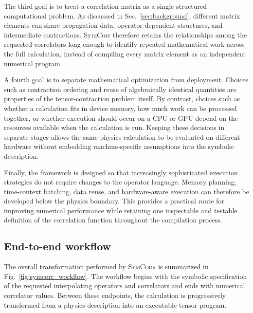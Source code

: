 \documentclass[11pt]{article}
\begin{document}
The third goal is to treat a correlation matrix as a single structured
computational problem. As discussed in Sec.~\ref{sec:background}, different
matrix elements can share propagation data, operator-dependent structures, and
intermediate contractions. SymCorr therefore retains the relationships among
the requested correlators long enough to identify repeated mathematical work
across the full calculation, instead of compiling every matrix element as an
independent numerical program.

A fourth goal is to separate mathematical optimization from deployment. Choices
such as contraction ordering and reuse of algebraically identical quantities
are properties of the tensor-contraction problem itself. By contrast, choices
such as whether a calculation fits in device memory, how much work can be
processed together, or whether execution should occur on a CPU or GPU depend on
the resources available when the calculation is run. Keeping these decisions in
separate stages allows the same physics calculation to be evaluated on
different hardware without embedding machine-specific assumptions into the
symbolic description.

Finally, the framework is designed so that increasingly sophisticated execution
strategies do not require changes to the operator language. Memory planning,
time-context batching, data reuse, and hardware-aware execution can therefore
be developed below the physics boundary. This provides a practical route for
improving numerical performance while retaining one inspectable and testable
definition of the correlation function throughout the compilation process.

\subsection{End-to-end workflow}

The overall transformation performed by \textsc{SymCorr} is summarized in
Fig.~\ref{fig:symcorr_workflow}. The workflow begins with the symbolic
specification of the requested interpolating operators and correlators and ends
with numerical correlator values. Between these endpoints, the calculation is
progressively transformed from a physics description into an executable tensor
program.
\end{document}
